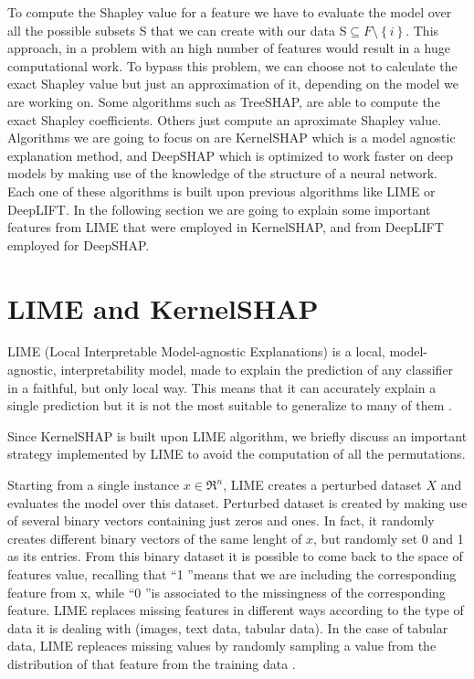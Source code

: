 \documentclass[11pt]{report}
\begin{document}
To compute the Shapley value for a feature we have to evaluate the model over all the possible subsets S that we can create with our data S$\subseteq F \setminus \left\{i\right\}$.
This approach, in a problem with an high number of features would result in a huge computational work.
To bypass this problem, we can choose not to calculate the exact Shapley value but just an approximation of it, depending on the model we are working on.
Some algorithms such as TreeSHAP, are able to compute the exact Shapley coefficients.
Others just compute an aproximate Shapley value.
Algorithms we are going to focus on are KernelSHAP which is a model agnostic explanation method, and DeepSHAP which is optimized to work faster on deep models by making use of the knowledge of the structure of a neural network.
Each one of these algorithms is built upon previous algorithms like LIME or DeepLIFT.
In the following section we are going to explain some important features from LIME that were employed in KernelSHAP, and from DeepLIFT employed for DeepSHAP.

\section{LIME and KernelSHAP}\label{sec:lime}\hfill

LIME (Local Interpretable Model-agnostic Explanations) is a local, model-agnostic, interpretability model, made to explain the prediction of any classifier in a faithful, but only local way.
This means that it can accurately explain a single prediction but it is not the most suitable to generalize to many of them \cite{ribeiro-2016}.

Since KernelSHAP is built upon LIME algorithm, we briefly discuss an important strategy implemented by LIME to avoid the computation of all the permutations.

Starting from a single instance  $x \in \Re^n$, LIME creates a perturbed dataset $X$ and evaluates the model over this dataset.
Perturbed dataset is created by making use of several binary vectors containing just zeros and ones.
In fact, it randomly creates different binary vectors of the same lenght of $x$, but randomly set 0 and 1 as its entries.
From this binary dataset it is possible to come back to the space of features value, recalling that \textquotedblleft 1 \textquotedblright means that we are including the corresponding feature from x, while \textquotedblleft 0 \textquotedblright is associated to the missingness of the corresponding feature.
LIME replaces missing features in different ways according to the type of data it is dealing with (images, text data, tabular data).
In the case of tabular data, LIME repleaces missing values by randomly sampling a value from the distribution of that feature from the training data  \cite{ferrando2018}.
\end{document}
